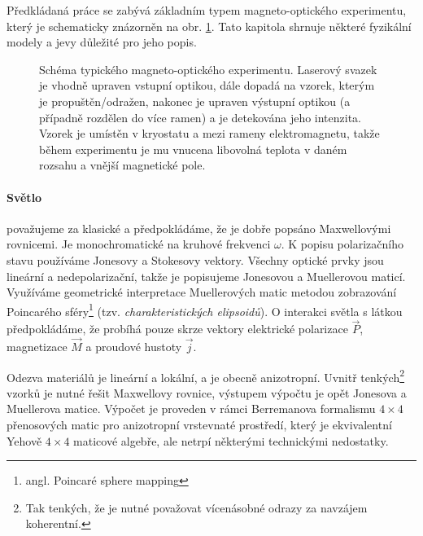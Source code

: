 Předkládaná práce se zabývá základním typem magneto-optického experimentu, který je schematicky znázorněn na obr. \ref{fig:uvodni-diagram}.
Tato kapitola shrnuje některé fyzikální modely a jevy důležité pro jeho popis.

\begin{figure}[htbp]
    \centering
    
    \caption{Schéma typického magneto-optického experimentu. 
    Laserový svazek je vhodně upraven vstupní optikou, dále dopadá na vzorek, kterým je propuštěn/odražen, nakonec je upraven výstupní optikou (a případně rozdělen do více ramen) a je detekována jeho intenzita. 
    Vzorek je umístěn v kryostatu a mezi rameny elektromagnetu, takže během experimentu je mu vnucena libovolná teplota v daném rozsahu a vnější magnetické pole.}
    \label{fig:uvodni-diagram}
\end{figure}


\paragraph{Světlo}
považujeme za klasické a předpokládáme, že je dobře popsáno Maxwellovými rovnicemi.
Je monochromatické na kruhové frekvenci $\omega$.
K popisu polarizačního stavu používáme Jonesovy a Stokesovy vektory.
Všechny optické prvky jsou lineární a nedepolarizační, takže je popisujeme Jonesovou a Muellerovou maticí\cite{gilReviewMuellerMatrix2014}.
Využíváme geometrické interpretace Muellerových matic metodou zobrazování Poincarého sféry\footnote{angl. Poincaré sphere mapping} (tzv. \emph{charakteristických elipsoidů})\cite{gilReviewMuellerMatrix2014,ossikovskiPoincareSphereMapping2013}.
O interakci světla s látkou předpokládáme, že probíhá pouze skrze vektory elektrické polarizace $\vec{P}$, magnetizace $\vec{M}$ a proudové hustoty $\vec{j}$. 

Odezva materiálů je lineární a lokální, a je obecně anizotropní. 
Uvnitř tenkých\footnote{Tak tenkých, že je nutné považovat vícenásobné odrazy za navzájem koherentní.} vzorků je nutné řešit Maxwellovy rovnice, výstupem výpočtu je opět Jonesova a Muellerova matice.
Výpočet je proveden v rámci Berremanova formalismu\cite{berremanOpticsStratifiedAnisotropic1972} $4\times 4$ přenosových matic pro anizotropní vrstevnaté prostředí, který je ekvivalentní Yehově $4\times 4$ maticové algebře\cite{yehElectromagneticPropagationBirefringent1979}, ale netrpí některými technickými nedostatky\cite{xuOpticalDegeneraciesAnisotropic2000,wuSingularitiesMatrixFormalisms2018,garibelloSingularityYehTransfer2020,bertrandGeneralAnalyticalTreatment2001}.
        
